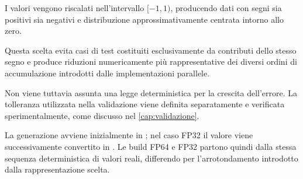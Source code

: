 I valori vengono riscalati nell'intervallo $[-1,1)$, producendo dati con
segni sia positivi sia negativi e distribuzione approssimativamente
centrata intorno allo zero.

Questa scelta evita casi di test costituiti esclusivamente da contributi
dello stesso segno e produce riduzioni numericamente più rappresentative
dei diversi ordini di accumulazione introdotti dalle implementazioni
parallele.

Non viene tuttavia assunta una legge deterministica per la crescita
dell'errore. La tolleranza utilizzata nella validazione viene definita
separatamente e verificata sperimentalmente, come discusso nel
\cref{cap:validazione}.

La generazione avviene inizialmente in ; nel caso FP32 il
valore viene successivamente convertito in . Le build FP64 e
FP32 partono quindi dalla stessa sequenza deterministica di valori reali,
differendo per l'arrotondamento introdotto dalla rappresentazione scelta.